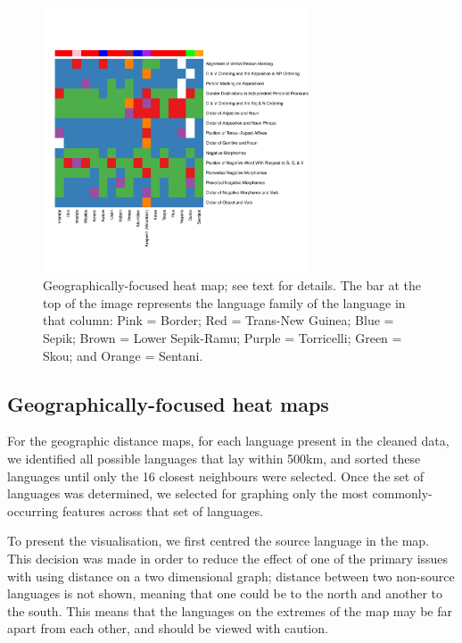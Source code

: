 \documentclass[11pt]{article}
\begin{document}
\begin{figure}[!t]
\includegraphics[width=3.1in]
{graph2yim.pdf} 
\caption{Geographically-focused heat map; see text for details. The bar at the top of the image represents the language family of the language in that column: Pink = Border; Red = Trans-New Guinea; Blue = Sepik; Brown = Lower Sepik-Ramu; Purple = Torricelli; Green = Skou; and Orange = Sentani.} 
\label{fig:heat1} 
\end{figure}


\subsection{Geographically-focused heat maps}
For the geographic distance maps, for each language present in the cleaned data, we identified all possible languages that lay within 500km, and sorted these languages until only the 16 closest neighbours were selected. Once the set of languages was determined, we selected for graphing only the most commonly-occurring features across that set of languages.


To present the visualisation, we first centred the source language in the map. This decision was made in order to reduce the effect of one of the primary issues with using distance on a two dimensional graph; distance between two non-source languages is not shown, meaning that one could be to the north and another to the south. This means that the languages on the extremes of the map may be far apart from each other, and should be viewed with caution. %
\end{document}
